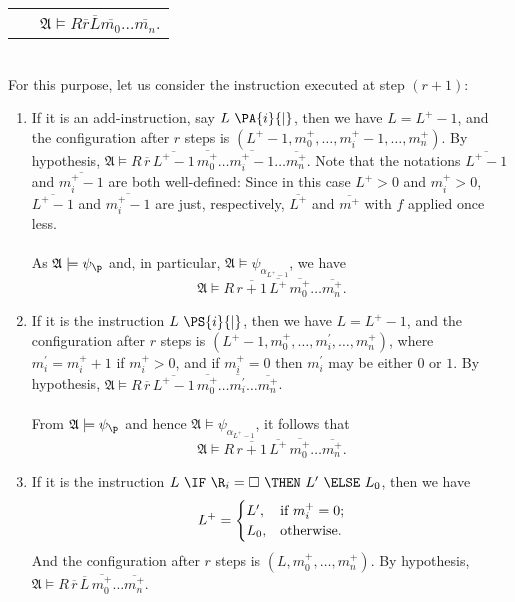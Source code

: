 \begin{enumerate}[1.]
\begin{center}
\begin{tabular}{ll}
\ & $\mathfrak{A} \models R \overline{r} \overline{L} \overline{m_0} \ldots \overline{m_n}$.
\end{tabular}
\end{center}
\ \\
For this purpose, let us consider the instruction executed at step $(r + 1)$:
\begin{enumerate}[1)]
\item If it is an add-instruction, say $L \ \PA{i}{|}$, then we have $L = L^+ - 1$, and the configuration after $r$ steps is $(L^+ - 1, m_0^+, \ldots, m_i^+ - 1, \ldots, m_n^+)$. By hypothesis, $\mathfrak{A} \models R \, \overline{r} \, \overline{L^+ - 1} \, \overline{m_0^+} \ldots \overline{m_i^+ - 1} \ldots \overline{m_n^+}$. Note that the notations $\overline{L^+ - 1}$ and $\overline{m_i^+ - 1}$ are both well-defined: Since in this case $L^+ > 0$ and $m_i^+ > 0$, $\overline{L^+ - 1}$ and $\overline{m_i^+ - 1}$ are just, respectively, $\overline{L^+}$ and $\overline{m^+}$ with $f$ applied once less.\\
\ \\
As $\mathfrak{A} \models \psi_\p$ and, in particular, $\mathfrak{A} \models \psi_{\alpha_{L^+ - 1}}$, we have
\[
\mathfrak{A} \models R \, \overline{r + 1} \, \overline{L^+} \, \overline{m_0^+} \ldots \overline{m_n^+}.
\]
\item If it is the instruction $L \ \PS{i}{|}$, then we have $L = L^+ - 1$, and the configuration after $r$ steps is $(L^+ - 1, m_0^+, \ldots, m_i^\prime, \ldots, m_n^+)$, where $m_i^\prime = m_i^+ + 1$ if $m_i^+ > 0$, and if $m_i^+ = 0$ then $m_i^\prime$ may be either $0$ or $1$. By hypothesis, $\mathfrak{A} \models R \, \overline{r} \, \overline{L^+ - 1} \, \overline{m_0^+} \ldots \overline{m_i^\prime} \ldots \overline{m_n^+}$.\\
\ \\
From $\mathfrak{A} \models \psi_\p$ and hence $\mathfrak{A} \models \psi_{\alpha_{L^+ - 1}}$, it follows that
\[
\mathfrak{A} \models R \, \overline{r + 1} \, \overline{L^+} \, \overline{m_0^+} \ldots \overline{m_n^+}.
\]
\item If it is the instruction $L \ \IF \ \R_i = \Box \ \THEN \ L^\prime \ \ELSE \ L_0$, then we have
\[
L^+ = \begin{cases}
L^\prime,  & \mbox{if \(m_i^+ = 0\)}; \cr
L_0,       & \mbox{otherwise}.
\end{cases}
\]
And the configuration after $r$ steps is $(L, m_0^+, \ldots, m_n^+)$. By hypothesis, $\mathfrak{A} \models R \, \overline{r} \, \overline{L} \, \overline{m_0^+} \ldots \overline{m_n^+}$.\\

\end{enumerate}
\end{enumerate}
